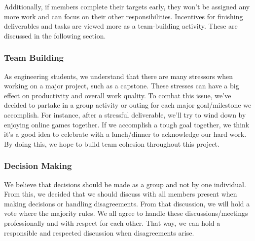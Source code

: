\documentclass{article}
\begin{document}
Additionally, if members complete their targets early, 
they won’t be assigned any more work and can focus on 
their other responsibilities. 
Incentives for finishing deliverables and tasks are 
viewed more as a team-building activity. 
These are discussed in the following section. \\


\subsubsection*{Team Building}


As engineering students, 
we understand that there are many stressors when working on a major project,
 such as a capstone. 
 These stresses can have a big effect on productivity and overall work quality.
 To combat this issue, we’ve decided to partake in a group activity or outing
 for each major goal/milestone we accomplish. For instance, after a stressful 
 deliverable, we’ll try to wind down by enjoying online games together. 
 If we accomplish a tough goal together, we think it’s a good idea to
 celebrate with a lunch/dinner to acknowledge our hard work. 
 By doing this, we hope to build team cohesion throughout this project.

\subsubsection*{Decision Making} 


We believe that decisions should be made as a group and not by one individual.
 From this, we decided that we should discuss with all members present when 
 making decisions or handling disagreements. From that discussion, 
 we will hold a vote where the majority rules. 
 We all agree to handle these discussions/meetings professionally
 and with respect for each other. That way, we can hold a responsible
 and respected discussion when disagreements arise. 
\end{document}
